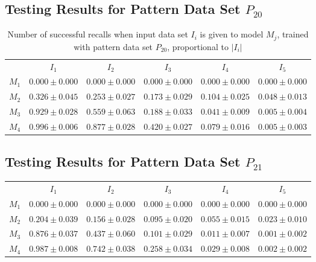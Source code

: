 \documentclass[12pt]{article}
\begin{document}
\begin{appendices}
\subsection{Testing Results for Pattern Data Set $P_{20}$}


    \begin{table}[H]
    \centering
    \def\arraystretch{1.5}
    \footnotesize
    \begin{tabular}{cccccc}
    
 & $I_{1}$  & $I_{2}$  & $I_{3}$  & $I_{4}$  & $I_{5}$ \\ \cline{2-6}
$M_{1}$  & $0.000\pm0.000$  & $0.000\pm0.000$  & $0.000\pm0.000$  & $0.000\pm0.000$  & $0.000\pm0.000$ \\
$M_{2}$  & $0.326\pm0.045$  & $0.253\pm0.027$  & $0.173\pm0.029$  & $0.104\pm0.025$  & $0.048\pm0.013$ \\
$M_{3}$  & $0.929\pm0.028$  & $0.559\pm0.063$  & $0.188\pm0.033$  & $0.041\pm0.009$  & $0.005\pm0.004$ \\
$M_{4}$  & $0.996\pm0.006$  & $0.877\pm0.028$  & $0.420\pm0.027$  & $0.079\pm0.016$  & $0.005\pm0.003$ \\

    \end{tabular}
    \caption{Number of successful recalls when input data set $I_i$ is given to model $M_j$, trained with pattern data set $P_{20}$, proportional to $\left|I_i\right|$}
    \end{table}
    
\subsection{Testing Results for Pattern Data Set $P_{21}$}


    \begin{table}[H]
    \centering
    \def\arraystretch{1.5}
    \footnotesize
    \begin{tabular}{cccccc}
    
 & $I_{1}$  & $I_{2}$  & $I_{3}$  & $I_{4}$  & $I_{5}$ \\ \cline{2-6}
$M_{1}$  & $0.000\pm0.000$  & $0.000\pm0.000$  & $0.000\pm0.000$  & $0.000\pm0.000$  & $0.000\pm0.000$ \\
$M_{2}$  & $0.204\pm0.039$  & $0.156\pm0.028$  & $0.095\pm0.020$  & $0.055\pm0.015$  & $0.023\pm0.010$ \\
$M_{3}$  & $0.876\pm0.037$  & $0.437\pm0.060$  & $0.101\pm0.029$  & $0.011\pm0.007$  & $0.001\pm0.002$ \\
$M_{4}$  & $0.987\pm0.008$  & $0.742\pm0.038$  & $0.258\pm0.034$  & $0.029\pm0.008$  & $0.002\pm0.002$ \\


\end{tabular}
\end{table}
\end{appendices}
\end{document}

